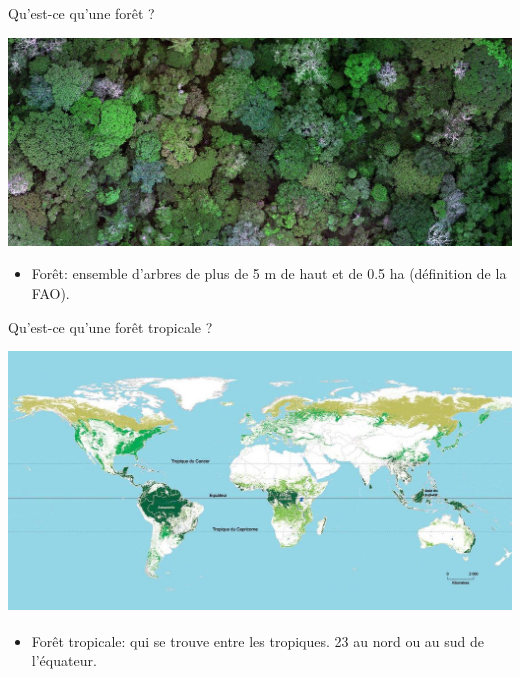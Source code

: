 \documentclass[10pt,table,dvipsnames,compress]{beamer}
\begin{document}
\begin{frame}[label={sec:org1714ca6}]{Qu'est-ce qu'une forêt ?}
\begin{center}
\includegraphics[width=\textwidth]{figs/vue-drone-foret-tropicale-2.jpg}
\end{center}

\begin{itemize}
\item Forêt: ensemble d'arbres de plus de 5 m de haut et de 0.5 ha (définition de la FAO).
\end{itemize}
\end{frame}
\begin{frame}[label={sec:orga41392f}]{Qu'est-ce qu'une forêt tropicale ?}
\begin{center}
\includegraphics[width=\textwidth]{figs/carte-des-forets-tropicales.jpg}
\end{center}

\begin{itemize}
\item Forêt tropicale: qui se trouve entre les tropiques. \textpm{}23\textsuperscript{\textdegree{}} au nord ou au sud de l'équateur.
\end{itemize}
\end{frame}
\end{document}
